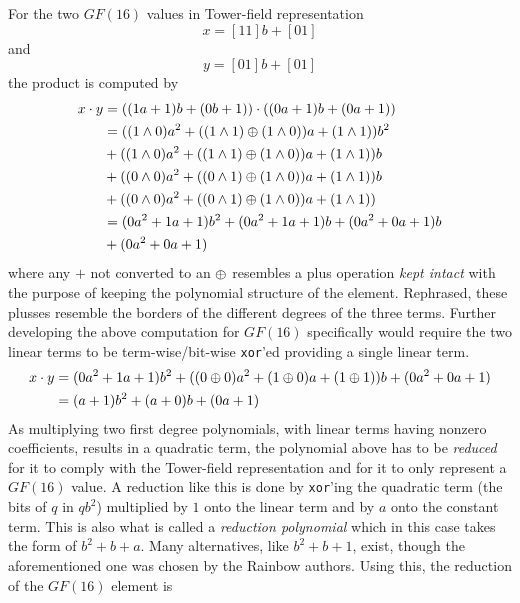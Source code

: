 For the two $GF(16)$ values in Tower-field representation
$$
    x = [11]b + [01]
$$
and
$$
    y = [01]b + [01]
$$
the product is computed by
\begin{equation*}
    \begin{split}
        x \cdot y &= ((1a + 1)b + (0b + 1)) \cdot ((0a + 1)b + (0a + 1))\\
        &= ((1 \wedge 0)a^2 + ((1 \wedge 1) \oplus (1 \wedge 0))a + (1 \wedge 1))b^2\\ 
        &+ ((1 \wedge 0)a^2 + ((1 \wedge 1) \oplus (1 \wedge 0))a + (1 \wedge 1))b\\
        &+ ((0 \wedge 0)a^2 + ((0 \wedge 1) \oplus (1 \wedge 0))a + (1 \wedge 1))b\\
        &+ ((0 \wedge 0)a^2 + ((0 \wedge 1) \oplus (1 \wedge 0))a + (1 \wedge 1))\\
        &= (0a^2 + 1a + 1)b^2 + (0a^2 + 1a + 1)b + (0a^2 + 0a + 1)b\\
        &+ (0a^2 + 0a + 1)\\
    \end{split}
\end{equation*}
where any $+$ not converted to an $\oplus$ resembles a plus operation \emph{kept intact} with the purpose of keeping the polynomial structure of the element. Rephrased, these plusses resemble the borders of the different degrees of the three terms. Further developing the above computation for $GF(16)$ specifically would require the two linear terms to be term-wise/bit-wise \texttt{xor}'ed providing a single linear term.
\begin{equation*}
    \begin{split}
        x\cdot y &= (0a^2 + 1a + 1)b^2 + ((0 \oplus 0)a^2 + (1 \oplus 0)a + (1 \oplus 1))b + (0a^2 + 0a + 1)\\
        &= (a + 1)b^2 + (a + 0)b + (0a + 1)
    \end{split}
\end{equation*}
As multiplying two first degree polynomials, with linear terms having nonzero coefficients, results in a quadratic term, the polynomial above has to be \emph{reduced} for it to comply with the Tower-field representation and for it to only represent a $GF(16)$ value. A reduction like this is done by \texttt{xor}'ing the quadratic term (the bits of $q$ in $qb^2$) multiplied by $1$ onto the linear term and by $a$ onto the constant term. This is also what is called a \emph{reduction polynomial} which in this case takes the form of $b^2 + b + a$. Many alternatives, like $b^2 + b + 1$, exist, though the aforementioned one was chosen by the Rainbow authors. Using this, the reduction of the $GF(16)$ element is
